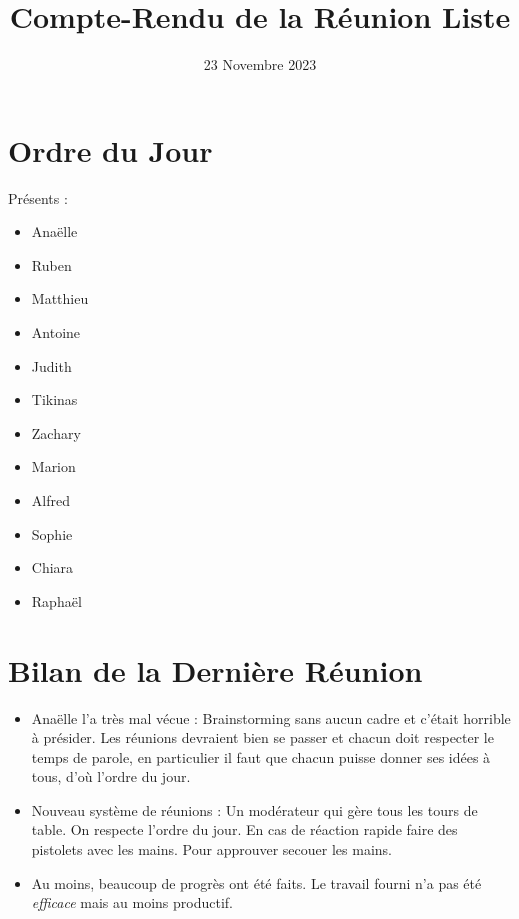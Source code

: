 \documentclass{article}
\title{Compte-Rendu de la Réunion Liste}
\date{23 Novembre 2023}
\author{}
\begin{document}
\maketitle
\section*{Ordre du Jour}
Présents : 
\begin{itemize}
    \item Anaëlle
    \item Ruben
    \item Matthieu
    \item Antoine 
    \item Judith
    \item Tikinas
    \item Zachary
    \item Marion
    \item Alfred 
    \item Sophie
    \item Chiara
    \item Raphaël
\end{itemize}
\tableofcontents

\section{Bilan de la Dernière Réunion}
\begin{itemize}
    \item Anaëlle l'a très mal vécue : Brainstorming sans aucun cadre et c'était horrible à présider. Les réunions devraient bien se passer et chacun doit respecter le temps de parole, en particulier il faut que chacun puisse donner ses idées à tous, d'où l'ordre du jour. 
    \item Nouveau système de réunions : Un modérateur qui gère tous les tours de table. On respecte l'ordre du jour. En cas de réaction rapide faire des pistolets avec les mains. Pour approuver secouer les mains. 
    \item Au moins, beaucoup de progrès ont été faits. Le travail fourni n'a pas été \textsl{efficace} mais au moins productif. 
\end{itemize}
\end{document}
